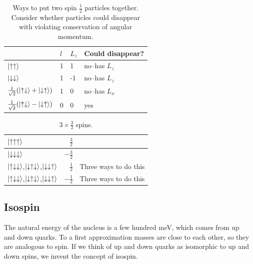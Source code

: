 \documentclass[]{article}
\begin{document}
\begin{table}[H]
	\begin{center}
		\caption[Ways to put two spin $\frac{1}{2}$ particles together]{Ways to put two spin $\frac{1}{2}$ particles together. Consider whether particles could disappear with violating conservation of angular momentum.}
		\begin{tabular}{|l|l|l|l|}\hline
			&$l$&$L_z$&Could disappear?\\ \hline
			$\ket{\uparrow\uparrow}$ &1&1&no--has $L_z$\\ \hline
			$\ket{\downarrow\downarrow}$&1&-1&no--has $L_z$ \\ \hline
			$\frac{1}{\sqrt{2}}(\ket{\uparrow\downarrow}+\ket{\downarrow\uparrow})$ &1&0&no--has $L_x$\\ \hline
			$\frac{1}{\sqrt{2}}(\ket{\uparrow\downarrow}-\ket{\downarrow\uparrow})$ &0&0&yes\\ \hline
		\end{tabular}
	\end{center}
\end{table}


\begin{table}[H]
	\begin{center}
		\caption{$3 \times \frac{3}{2}$ spins.}
		\begin{tabular}{|l|r|c|}\hline
			$\ket{\uparrow\uparrow\uparrow}$&$\frac{3}{2}$& \\ \hline
			$\ket{\downarrow\downarrow\downarrow}$&$-\frac{3}{2}$& \\ \hline
			$\ket{\uparrow\downarrow\downarrow}$,$\ket{\downarrow\uparrow\downarrow}$,$\ket{\downarrow\downarrow\uparrow}$&$\frac{1}{2}$&Three ways to do this\\ \hline
			$\ket{\uparrow\downarrow\downarrow}$,$\ket{\downarrow\uparrow\downarrow}$,$\ket{\downarrow\downarrow\uparrow}$&$-\frac{1}{2}$&Three ways to do this\\ \hline
		\end{tabular}
	\end{center}
\end{table}

\subsection{Isospin}

The natural energy of the nucleus is a few hundred meV, which comes from up and down quarks. To a first approximation masses are close to each other, so they are analogous to spin. If we think of up and down quarks as isomorphic to up and down spins, we invent the concept of isospin.
\end{document}
